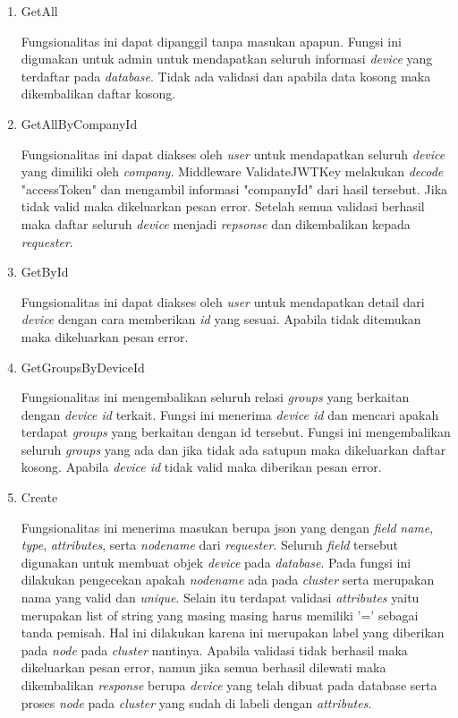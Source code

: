 \begin{enumerate}
  \item GetAll

        Fungsionalitas ini dapat dipanggil tanpa masukan apapun. Fungsi ini digunakan untuk admin untuk mendapatkan seluruh informasi \textit{device} yang terdaftar pada \textit{database}. Tidak ada validasi dan apabila data kosong maka dikembalikan daftar kosong.

  \item GetAllByCompanyId

        Fungsionalitas ini dapat diakses oleh \textit{user} untuk mendapatkan seluruh \textit{device} yang dimiliki oleh \textit{company}. Middleware ValidateJWTKey  melakukan \textit{decode} "accessToken" dan mengambil informasi "companyId" dari hasil tersebut. Jika tidak valid maka dikeluarkan pesan error. Setelah semua validasi berhasil maka daftar seluruh \textit{device} menjadi \textit{repsonse} dan dikembalikan kepada \textit{requester}.

  \item GetById

        Fungsionalitas ini dapat diakses oleh \textit{user} untuk mendapatkan detail dari \textit{device} dengan cara memberikan \textit{id} yang sesuai. Apabila tidak ditemukan maka dikeluarkan pesan error.

  \item GetGroupsByDeviceId


        Fungsionalitas ini mengembalikan seluruh relasi \textit{groups} yang berkaitan dengan \textit{device id} terkait. Fungsi ini menerima \textit{device id} dan mencari apakah terdapat \textit{groups} yang berkaitan dengan id tersebut. Fungsi ini mengembalikan seluruh \textit{groups} yang ada dan jika tidak ada satupun maka dikeluarkan daftar kosong. Apabila \textit{device id} tidak valid maka diberikan pesan error.

  \item Create

        Fungsionalitas ini menerima masukan berupa json yang dengan \textit{field} \textit{name}, \textit{type}, \textit{attributes}, serta \textit{node\textunderscore name} dari \textit{requester}. Seluruh \textit{field} tersebut digunakan untuk membuat objek \textit{device} pada \textit{database}. Pada fungsi ini dilakukan pengecekan apakah \textit{node\textunderscore name} ada pada \textit{cluster} serta merupakan nama yang valid dan \textit{unique}. Selain itu terdapat validasi \textit{attributes} yaitu merupakan list of string yang masing masing harus memiliki '=' sebagai tanda pemisah. Hal ini dilakukan karena ini merupakan label yang diberikan pada \textit{node} pada \textit{cluster} nantinya. Apabila validasi tidak berhasil maka dikeluarkan pesan error, namun jika semua berhasil dilewati maka dikembalikan \textit{response} berupa \textit{device} yang telah dibuat pada database serta proses \textit{node} pada \textit{cluster} yang sudah di labeli dengan \textit{attributes}.


\end{enumerate}
